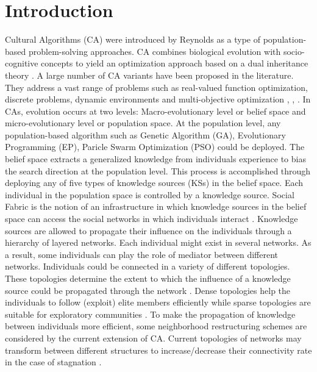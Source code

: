 \documentclass[letterpaper]{article}
\begin{document}
\section{Introduction}
Cultural Algorithms (CA) were introduced by Reynolds as a type of population-based problem-solving approaches. CA combines biological evolution with socio-cognitive concepts to yield an optimization approach based on a dual inheritance theory \cite{reynolds1994introduction} \cite{kennedy2001swarm}. A large number of CA variants have been proposed in the literature. They address a vast range of problems such as real-valued function optimization, discrete problems, dynamic environments and multi-objective optimization \cite{RaeesiN.2014}, \cite{reynolds2008computing}, \cite{che2010robust}. \newline In CAs, evolution occurs at two levels: Macro-evolutionary level or belief space and micro-evolutionary level or population space. At the population level, any population-based algorithm such as Genetic Algorithm (GA), Evolutionary Programming (EP), Paricle Swarm Optimization (PSO) could be deployed. The belief space extracts a generalized knowledge from individuals experience to bias the search direction at the population level. This process is accomplished through deploying any of five types of knowledge sources (KSs) in the belief space. Each individual in the population space is controlled by a knowledge source. \newline 
Social Fabric is the notion of an infrastructure in which knowledge sources in the belief space can access the social networks in which individuals interact \cite{reynolds2008social}. Knowledge sources are allowed to propagate their influence on the individuals through a hierarchy of layered networks. Each individual might exist in several networks. As a result, some individuals can play the role of mediator between different networks. \newline
Individuals could be connected in a variety of different topologies. These topologies determine the extent to which the influence of a knowledge source could be propagated through the network \cite{ali2011boosting}. Dense topologies help the individuals to follow (exploit) elite members efficiently while sparse topologies are suitable for exploratory communities \cite{mendes2004population}. To make the propagation of knowledge between individuals more efficient, some neighborhood restructuring schemes are considered by the current extension of CA. Current topologies of networks may transform between different structures to increase/decrease their connectivity rate in the case of stagnation \cite{ali2016leveraged}. \newline
\end{document}
